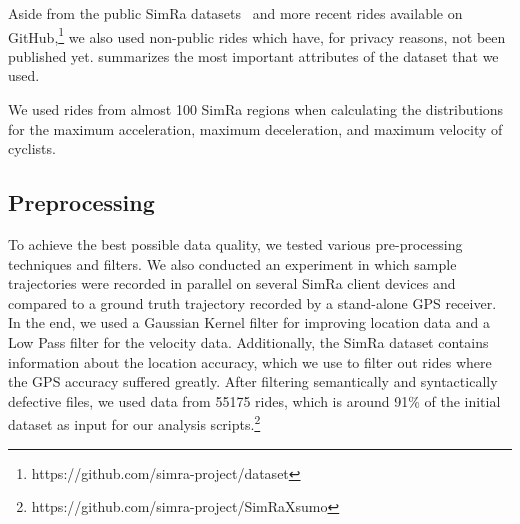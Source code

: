 Aside from the public SimRa datasets~\cite{dataset_simra_set1,dataset_simra_set2, dataset_simra_set3} and more recent rides available on GitHub,\footnote{https://github.com/simra-project/dataset} we also used non-public rides which have, for privacy reasons, not been published yet.
 summarizes the most important attributes of the dataset that we used.

We used rides from almost \num{100} SimRa regions when calculating the distributions for the maximum acceleration, maximum deceleration, and maximum velocity of cyclists.

\subsection{Preprocessing}
\label{subsec:preprocessing_sumo}
To achieve the best possible data quality, we tested various pre-processing techniques and filters.
We also conducted an experiment in which sample trajectories were recorded in parallel on several SimRa client devices and compared to a ground truth trajectory recorded by a stand-alone GPS receiver.
In the end, we used a Gaussian Kernel filter for improving location data and a Low Pass filter for the velocity data.
Additionally, the SimRa dataset contains information about the location accuracy, which we use to filter out rides where the GPS accuracy suffered greatly.
After filtering semantically and syntactically defective files, we used data from \num{55175} rides, which is around \num{91}\% of the initial dataset as input for our analysis scripts.\footnote{https://github.com/simra-project/SimRaX\ac{sumo}}
